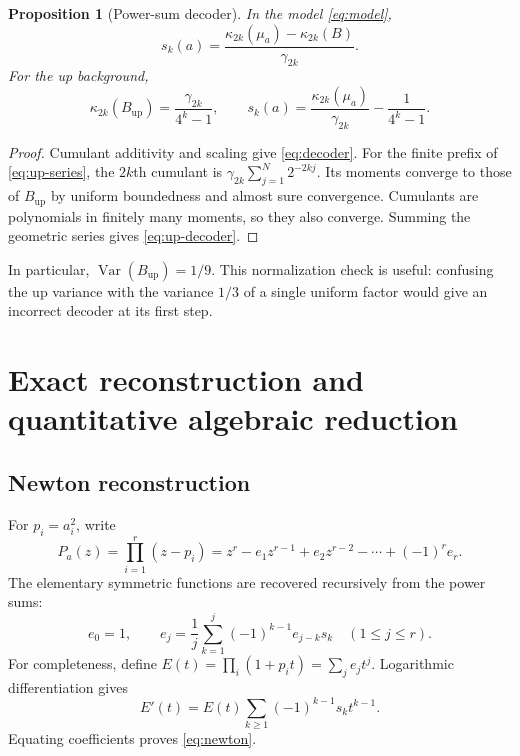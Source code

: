 \documentclass[11pt,a4paper]{article}
\numberwithin{equation}{section}
\newtheorem{proposition}[proposition]{Proposition}
\theoremstyle{definition}
\theoremstyle{remark}
\newcommand{\up}{\operatorname{up}}
\newcommand{\kap}{\kappa}
\begin{document}
\begin{proposition}[Power-sum decoder]
\label{prop:decoder}
In the model \eqref{eq:model},
\begin{equation}
 s_k(a)=\frac{\kap_{2k}(\mu_a)-\kap_{2k}(B)}{\gamma_{2k}}.
 \label{eq:decoder}
\end{equation}
For the up background,
\begin{equation}
 \kap_{2k}(B_{\up})=\frac{\gamma_{2k}}{4^k-1},\qquad
 s_k(a)=\frac{\kap_{2k}(\mu_a)}{\gamma_{2k}}-\frac1{4^k-1}.
 \label{eq:up-decoder}
\end{equation}
\end{proposition}
\begin{proof}
Cumulant additivity and scaling give \eqref{eq:decoder}.  For the finite prefix
of \eqref{eq:up-series}, the $2k$th cumulant is
$\gamma_{2k}\sum_{j=1}^N2^{-2kj}$.  Its moments converge to those of $B_{\up}$
by uniform boundedness and almost sure convergence.  Cumulants are polynomials
in finitely many moments, so they also converge.  Summing the geometric series
gives \eqref{eq:up-decoder}.
\end{proof}
In particular, $\operatorname{Var}(B_{\up})=1/9$.  This normalization check is
useful: confusing the up variance with the variance $1/3$ of a single uniform
factor would give an incorrect decoder at its first step.

\section{Exact reconstruction and quantitative algebraic reduction}
\label{sec:algebra}

\subsection{Newton reconstruction}
For $p_i=a_i^2$, write
\begin{equation}
 P_a(z)=\prod_{i=1}^r(z-p_i)
       =z^r-e_1z^{r-1}+e_2z^{r-2}-\cdots+(-1)^re_r.
 \label{eq:poly}
\end{equation}
The elementary symmetric functions are recovered recursively from the power sums:
\begin{equation}
 e_0=1,\qquad
 e_j=\frac1j\sum_{k=1}^j(-1)^{k-1}e_{j-k}s_k
 \quad(1\le j\le r).
 \label{eq:newton}
\end{equation}
For completeness, define $E(t)=\prod_i(1+p_it)=\sum_j e_jt^j$.
Logarithmic differentiation gives
\[
 E'(t)=E(t)\sum_{k\ge1}(-1)^{k-1}s_kt^{k-1}.
\]
Equating coefficients proves \eqref{eq:newton}.
\end{document}
